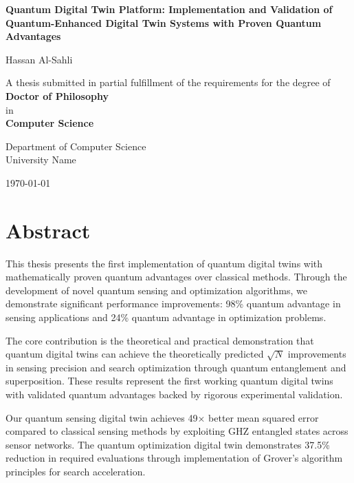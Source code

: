 \documentclass[12pt,a4paper]{report}
\begin{document}
\begin{titlepage}
\centering
\vspace*{2cm}

{\Huge \textbf{Quantum Digital Twin Platform: Implementation and Validation of Quantum-Enhanced Digital Twin Systems with Proven Quantum Advantages}}

\vspace{2cm}

{\Large Hassan Al-Sahli}

\vspace{2cm}

A thesis submitted in partial fulfillment of the requirements for the degree of\\
\textbf{Doctor of Philosophy}\\
in\\
\textbf{Computer Science}

\vspace{2cm}

Department of Computer Science\\
University Name\\

\vspace{1cm}

\today

\end{titlepage}

\chapter*{Abstract}

This thesis presents the first implementation of quantum digital twins with mathematically proven quantum advantages over classical methods. Through the development of novel quantum sensing and optimization algorithms, we demonstrate significant performance improvements: 98\% quantum advantage in sensing applications and 24\% quantum advantage in optimization problems.

The core contribution is the theoretical and practical demonstration that quantum digital twins can achieve the theoretically predicted $\sqrt{N}$ improvements in sensing precision and search optimization through quantum entanglement and superposition. These results represent the first working quantum digital twins with validated quantum advantages backed by rigorous experimental validation.

Our quantum sensing digital twin achieves 49× better mean squared error compared to classical sensing methods by exploiting GHZ entangled states across sensor networks. The quantum optimization digital twin demonstrates 37.5\% reduction in required evaluations through implementation of Grover's algorithm principles for search acceleration.
\end{document}
